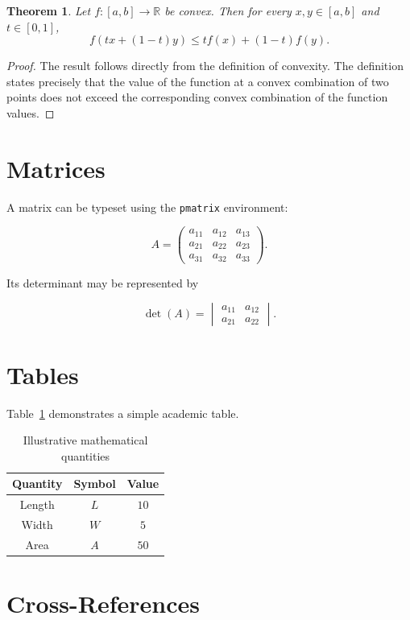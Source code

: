 \documentclass[12pt,a4paper]{article}
\newtheorem{theorem}{Theorem}
\theoremstyle{definition}
\begin{document}
\begin{theorem}
Let $f:[a,b]\rightarrow\mathbb{R}$ be convex. Then for every
$x,y\in[a,b]$ and $t\in[0,1]$,
\[
f(tx+(1-t)y)
\leq
tf(x)+(1-t)f(y).
\]
\end{theorem}

\begin{proof}
The result follows directly from the definition of convexity.
The definition states precisely that the value of the function at
a convex combination of two points does not exceed the corresponding
convex combination of the function values.
\end{proof}

\section{Matrices}

A matrix can be typeset using the \texttt{pmatrix} environment:

\[
A =
\begin{pmatrix}
a_{11} & a_{12} & a_{13}\\
a_{21} & a_{22} & a_{23}\\
a_{31} & a_{32} & a_{33}
\end{pmatrix}.
\]

Its determinant may be represented by

\[
\det(A)
=
\begin{vmatrix}
a_{11} & a_{12}\\
a_{21} & a_{22}
\end{vmatrix}.
\]

\section{Tables}

Table~\ref{tab:example} demonstrates a simple academic table.

\begin{table}[htbp]
\centering
\caption{Illustrative mathematical quantities}
\label{tab:example}
\begin{tabular}{ccc}
\toprule
Quantity & Symbol & Value \\
\midrule
Length & $L$ & $10$ \\
Width & $W$ & $5$ \\
Area & $A$ & $50$ \\
\bottomrule
\end{tabular}
\end{table}

\section{Cross-References}
\end{document}
